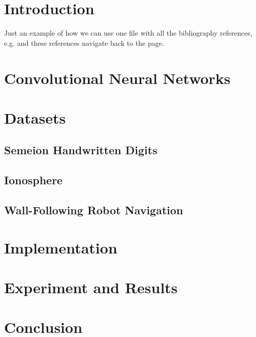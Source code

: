 \documentclass[a4paper, 11pt, twoside, openright]{article}
\begin{document}

\newpage
\tableofcontents %

\newpage
\section{Introduction}
Just an example of how we can use one file with all the bibliography references, e.g. \cite{Dibra.2016a} and these references navigate back to the page.

\section{Convolutional Neural Networks}

\section{Datasets}

\subsection{Semeion Handwritten Digits}

\subsection{Ionosphere}

\subsection{Wall-Following Robot Navigation}

\section{Implementation}

\section{Experiment and Results}

\section{Conclusion}

\newpage
\end{document}

